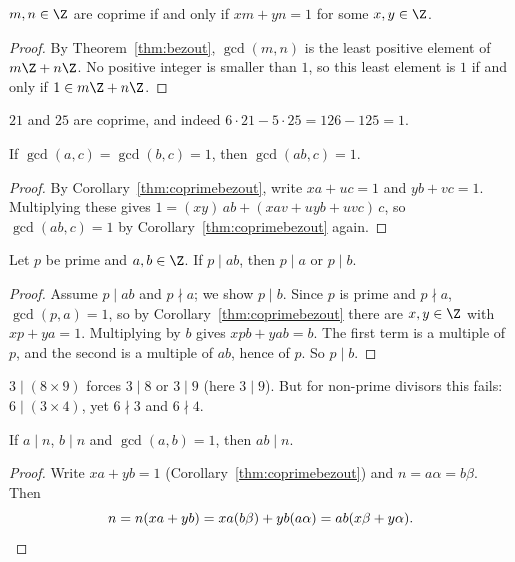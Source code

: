 \begin{corollary}
\label{thm:coprimebezout}
$m,n\in\Z$ are coprime if and only if $xm+yn=1$ for some $x,y\in\Z$.
\end{corollary}
\begin{proof}
By Theorem~\ref{thm:bezout}, $\gcd(m,n)$ is the least positive element of $m\Z+n\Z$. No positive integer is smaller than $1$, so this least element is $1$ if and only if $1\in m\Z+n\Z$.
\end{proof}

\begin{example}
$21$ and $25$ are coprime, and indeed $6\cdot21-5\cdot25=126-125=1$.
\end{example}

\begin{lemma}\label{lem:coprimeprod}
If $\gcd(a,c)=\gcd(b,c)=1$, then $\gcd(ab,c)=1$.
\end{lemma}
\begin{proof}
By Corollary~\ref{thm:coprimebezout}, write $xa+uc=1$ and $yb+vc=1$. Multiplying these gives $1=(xy)\,ab+(xav+uyb+uvc)\,c$, so $\gcd(ab,c)=1$ by Corollary~\ref{thm:coprimebezout} again.
\end{proof}

\bigskip
\begin{theorem}
\label{thm:euclidlemma}
Let $p$ be prime and $a,b\in\Z$. If $p\mid ab$, then $p\mid a$ or $p\mid b$.
\end{theorem}
\begin{proof}
Assume $p\mid ab$ and $p\nmid a$; we show $p\mid b$. Since $p$ is prime and $p\nmid a$, $\gcd(p,a)=1$, so by Corollary~\ref{thm:coprimebezout} there are $x,y\in\Z$ with $xp+ya=1$. Multiplying by $b$ gives $xpb+yab=b$. The first term is a multiple of $p$, and the second is a multiple of $ab$, hence of $p$. So $p\mid b$.
\end{proof}

\begin{note}
$3\mid(8\times9)$ forces $3\mid8$ or $3\mid9$ (here $3\mid9$). But for non-prime divisors this fails: $6\mid(3\times4)$, yet $6\nmid3$ and $6\nmid4$.
\end{note}

\begin{proposition}
\label{thm:coprimedivides}
If $a\mid n$, $b\mid n$ and $\gcd(a,b)=1$, then $ab\mid n$.
\end{proposition}
\begin{proof}
Write $xa+yb=1$ (Corollary~\ref{thm:coprimebezout}) and $n=a\alpha=b\beta$. Then
\[
n = n(xa+yb) = xa(b\beta)+yb(a\alpha) = ab(x\beta+y\alpha). \qedhere
\]
\end{proof}

